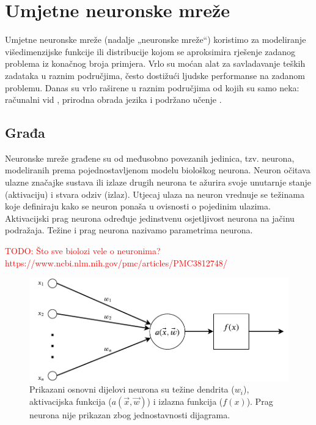 \documentclass[times, utf8, diplomski]{fer}
\def\TODO#1{\noindent\textcolor{red}{TODO: #1}\newline}
\begin{document}
\section{Umjetne neuronske mreže}
Umjetne neuronske mreže (nadalje „neuronske mreže“) koristimo za modeliranje višedimenzijske funkcije ili distribucije kojom se aproksimira rješenje zadanog problema iz konačnog broja primjera. Vrlo su moćan alat za savladavanje teških zadataka u raznim područjima, često dostižući ljudske performanse na zadanom problemu. Danas su vrlo raširene u raznim područjima od kojih su samo neka: računalni vid \citep{alexnet,yolo}, prirodna obrada jezika \citep{word2vec,char_cnn} i podržano učenje \citep{atari,active_learn}.

\subsection{Građa}
Neuronske mreže građene su od međusobno povezanih jedinica, tzv. neurona, modeliranih prema pojednostavljenom modelu biološkog neurona. Neuron očitava ulazne značajke sustava ili izlaze drugih neurona te ažurira svoje unutarnje stanje (aktivaciju) i stvara odziv (izlaz). Utjecaj ulaza na neuron vrednuje se težinama  koje definiraju kako se neuron ponaša u ovisnosti o pojedinim ulazima. Aktivacijski prag neurona  određuje jedinstvenu osjetljivost neurona na jačinu podražaja. Težine i prag neurona nazivamo parametrima neurona.

\TODO{Što sve biolozi vele o neuronima? https://www.ncbi.nlm.nih.gov/pmc/articles/PMC3812748/}

\begin{figure}[h]
\centering
\includegraphics[scale=0.7]{Neuron.pdf}
\caption{Prikazani osnovni dijelovi neurona su težine dendrita ($w_i$), aktivacijska funkcija ($a(\vec{x},\vec{w})$) i izlazna funkcija ($f(x)$). Prag neurona nije prikazan zbog jednostavnosti dijagrama.}
\label{fig:neuron}
\end{figure}
\end{document}
